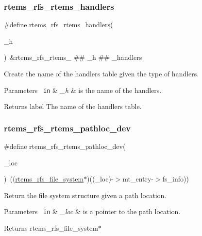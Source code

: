 \subsubsection{\texorpdfstring{rtems\_rfs\_rtems\_handlers}{rtems\_rfs\_rtems\_handlers}}
{\footnotesize\ttfamily \#define rtems\+\_\+rfs\+\_\+rtems\+\_\+handlers(\begin{DoxyParamCaption}\item[{}]{\+\_\+h }\end{DoxyParamCaption})~\&rtems\+\_\+rfs\+\_\+rtems\+\_\+ \#\# \+\_\+h \#\# \+\_\+handlers}

Create the name of the handler\textquotesingle{}s table given the type of handlers.


\begin{DoxyParams}[1]{Parameters}
\mbox{\texttt{ in}}  & {\em \+\_\+h} & is the name of the handlers. \\
\hline
\end{DoxyParams}
\begin{DoxyReturn}{Returns}
label The name of the handler\textquotesingle{}s table. 
\end{DoxyReturn}
\mbox{\label{rtems-rfs-rtems_8h_a7effab77b709f297e12efd60f43c94f1}} 
\subsubsection{\texorpdfstring{rtems\_rfs\_rtems\_pathloc\_dev}{rtems\_rfs\_rtems\_pathloc\_dev}}
{\footnotesize\ttfamily \#define rtems\+\_\+rfs\+\_\+rtems\+\_\+pathloc\+\_\+dev(\begin{DoxyParamCaption}\item[{}]{\+\_\+loc }\end{DoxyParamCaption})~((\mbox{\hyperlink{struct__rtems__rfs__file__system}{rtems\+\_\+rfs\+\_\+file\+\_\+system}}$\ast$)((\+\_\+loc)-\/$>$mt\+\_\+entry-\/$>$fs\+\_\+info))}

Return the file system structure given a path location.


\begin{DoxyParams}[1]{Parameters}
\mbox{\texttt{ in}}  & {\em \+\_\+loc} & is a pointer to the path location. \\
\hline
\end{DoxyParams}
\begin{DoxyReturn}{Returns}
rtems\+\_\+rfs\+\_\+file\+\_\+system$\ast$ 
\end{DoxyReturn}
\mbox{\label{rtems-rfs-rtems_8h_ae25991a18d906d3ba04fe91336c93070}} 
